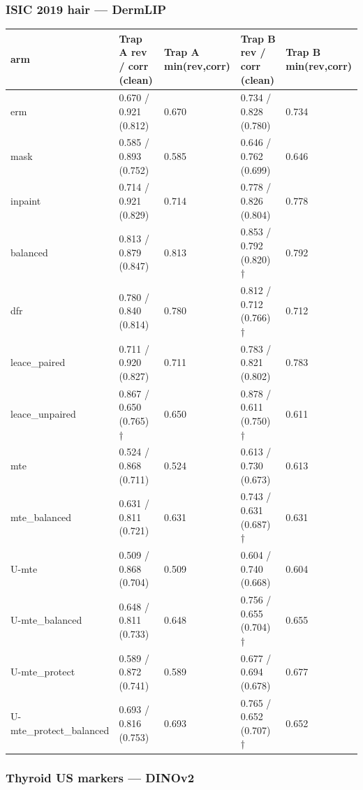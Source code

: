 {\subsubsection{ISIC 2019 hair --- DermLIP}\label{isic-2019-hair--dermlip}

{ %
\begin{longtable}[]{@{}lllll@{}}
\toprule\noalign{}
arm & Trap A rev / corr (clean) & Trap A min(rev,corr) & Trap B rev / corr (clean) & Trap B min(rev,corr) \\
\midrule\noalign{}
\endhead
\bottomrule\noalign{}
\endlastfoot
erm & 0.670 / 0.921 (0.812) & 0.670 & 0.734 / 0.828 (0.780) & 0.734 \\
mask & 0.585 / 0.893 (0.752) & 0.585 & 0.646 / 0.762 (0.699) & 0.646 \\
inpaint & 0.714 / 0.921 (0.829) & 0.714 & 0.778 / 0.826 (0.804) & 0.778 \\
balanced & 0.813 / 0.879 (0.847) & 0.813 & 0.853 / 0.792 (0.820) † & 0.792 \\
dfr & 0.780 / 0.840 (0.814) & 0.780 & 0.812 / 0.712 (0.766) † & 0.712 \\
leace\_paired & 0.711 / 0.920 (0.827) & 0.711 & 0.783 / 0.821 (0.802) & 0.783 \\
leace\_unpaired & 0.867 / 0.650 (0.765) † & 0.650 & 0.878 / 0.611 (0.750) † & 0.611 \\
mte & 0.524 / 0.868 (0.711) & 0.524 & 0.613 / 0.730 (0.673) & 0.613 \\
mte\_balanced & 0.631 / 0.811 (0.721) & 0.631 & 0.743 / 0.631 (0.687) † & 0.631 \\
U-mte & 0.509 / 0.868 (0.704) & 0.509 & 0.604 / 0.740 (0.668) & 0.604 \\
U-mte\_balanced & 0.648 / 0.811 (0.733) & 0.648 & 0.756 / 0.655 (0.704) † & 0.655 \\
U-mte\_protect & 0.589 / 0.872 (0.741) & 0.589 & 0.677 / 0.694 (0.678) & 0.677 \\
U-mte\_protect\_balanced & 0.693 / 0.816 (0.753) & 0.693 & 0.765 / 0.652 (0.707) † & 0.652 \\
\end{longtable}
}

\subsubsection{Thyroid US markers --- DINOv2}\label{thyroid-us-markers--dinov2}

}
